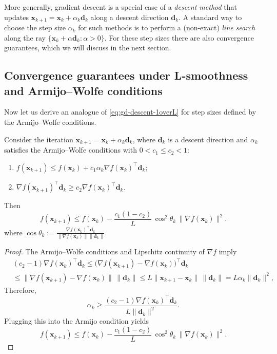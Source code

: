 More generally, gradient descent is a special case of a \emph{descent
method} that updates $\mathbf{x}_{k+1}=\mathbf{x}_k+\alpha_k \mathbf{d}_k$ along a
descent direction $\mathbf{d}_k$.
A standard way to choose the step size $\alpha_k$ for such methods
is to perform a (non-exact)
\emph{line search} along the ray $\{\mathbf{x}_k+\alpha \mathbf{d}_k:\alpha>0\}$.
For these step sizes there are also convergence guarantees, which we will discuss 
in the next section.

\subsection{Convergence guarantees under L-smoothness and Armijo--Wolfe conditions}
Now let us derive an analogue of \cref{eq:gd-descent-1overL} for step sizes defined by the
Armijo--Wolfe conditions.
\begin{theorem} \label{thm:armijo-wolfe-gd}
Consider the iteration $\mathbf{x}_{k+1}=\mathbf{x}_k+\alpha_k \mathbf{d}_k$, where
$\mathbf{d}_k$ is a descent
direction and $\alpha_k$ satisfies the Armijo--Wolfe conditions with $0<c_1\le c_2<1$:
\begin{enumerate}
  \item $f(\mathbf{x}_{k+1}) \le f(\mathbf{x}_k) + c_1 \alpha_k \nabla f(\mathbf{x}_k)^{\top }\mathbf{d}_k$;
  \item $\nabla f(\mathbf{x}_{k+1})^{\top }\mathbf{d}_k \ge c_2 \nabla f(\mathbf{x}_k)^{\top }\mathbf{d}_k$.
\end{enumerate}
Then
\[
  f(\mathbf{x}_{k+1})\le f(\mathbf{x}_k)-\frac{c_1(1-c_2)}{L}\,\cos^2\theta_k\,\|\nabla f(\mathbf{x}_k)\|^2.
\]
where $\cos\theta_k := \frac{\nabla f(\mathbf{x}_k)^{\top } \mathbf{d}_k }{\|\nabla f(\mathbf{x}_k)\|\|\mathbf{d}_k\|}$.
\end{theorem}
\begin{proof}
The Armijo--Wolfe conditions and Lipschitz continuity of $\nabla f$
imply
\begin{align*}  
  &(c_2 - 1) \nabla f(\mathbf{x}_k)^{\top } \mathbf{d}_k
  \le \bigl( \nabla f(\mathbf{x}_{k+1}) - \nabla f(\mathbf{x}_k)\bigr)^{\top }\mathbf{d}_k\\
  &\le \|\nabla f(\mathbf{x}_{k+1})-\nabla f(\mathbf{x}_k)\|\,\|\mathbf{d}_k\|
  \le L\|\mathbf{x}_{k+1} - \mathbf{x}_k \|\,\|\mathbf{d}_k \|
  = L\alpha_k \|\mathbf{d}_k\|^2,
\end{align*}
Therefore,
\[
  \alpha_k \ge \frac{(c_2 -1) \nabla f(\mathbf{x}_k)^{\top }\mathbf{d}_k }{L \|\mathbf{d}_k\|^2}.
\]
Plugging this into the Armijo condition yields
\begin{equation}
  \label{eq:armijo-wolfe-norm}
  f(\mathbf{x}_{k+1})\le f(\mathbf{x}_k)-\frac{c_1(1-c_2)}{L}\,\cos^2\theta_k\,\|\nabla f(\mathbf{x}_k)\|^2.
\end{equation}
\end{proof}

